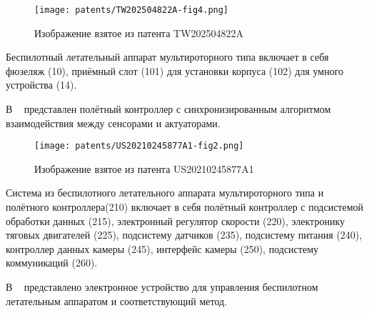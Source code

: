 \begin{figure}[H]
  \centering
  \texttt{[image: patents/TW202504822A-fig4.png]}
  \caption{Изображение взятое из патента TW202504822A}
\end{figure}


Беспилотный летательный аппарат мультироторного типа включает в
себя фюзеляж (10), приёмный слот (101) для установки корпуса (102) для
умного устройства (14).

В ~\cite{US20210245877A1} представлен полётный контроллер с
синхронизированным алгоритмом взаимодействия между сенсорами и
актуаторами.

\begin{figure}[H]
  \centering
  \texttt{[image: patents/US20210245877A1-fig2.png]}
  \caption{Изображение взятое из патента US20210245877A1}
\end{figure}

Система из беспилотного летательного аппарата мультироторного типа и
полётного контроллера(210) включает в себя полётный контроллер с
подсистемой обработки данных (215), электронный регулятор скорости
(220), электронику тяговых двигателей (225), подсистему датчиков
(235), подсистему питания (240), контроллер данных камеры (245),
интерфейс камеры (250), подсистему коммуникаций (260).

В ~\cite{US10551834B2} представлено электронное устройство для
управления беспилотном летательным аппаратом и соответствующий метод.


\newpage
